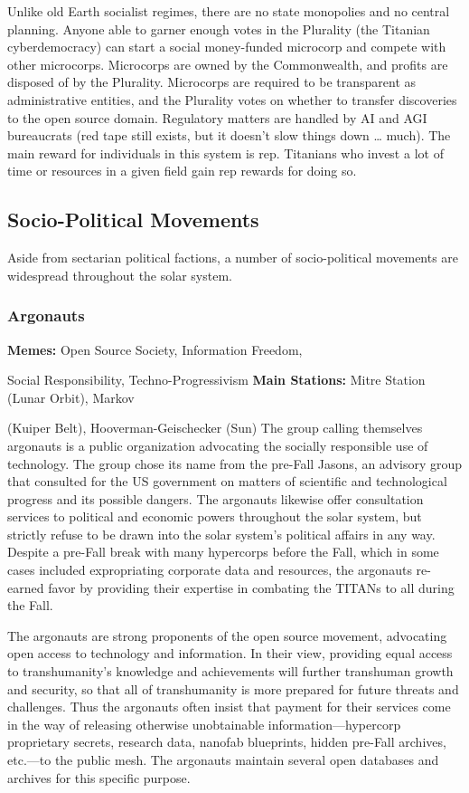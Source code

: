 Unlike old Earth socialist regimes, there are no state 
monopolies and no central planning. Anyone able to 
garner enough votes in the Plurality (the Titanian 
cyberdemocracy) can start a social money-funded 
microcorp and compete with other microcorps. 
Microcorps are owned by the Commonwealth, and 
profits are disposed of by the Plurality. Microcorps 
are required to be transparent as administrative entities, and the Plurality votes on whether to transfer 
discoveries to the open source domain. Regulatory 
matters are handled by AI and AGI bureaucrats (red 
tape still exists, but it doesn't slow things down …
much). The main reward for individuals in this system 
is rep. Titanians who invest a lot of time or resources 
in a given field gain rep rewards for doing so.

\subsection{Socio-Political Movements}

Aside from sectarian political factions, a number of 
socio-political movements are widespread throughout 
the solar system.

\subsubsection{Argonauts}

\textbf{Memes:} Open Source Society, Information Freedom, 

Social Responsibility, Techno-Progressivism
\textbf{Main Stations:} Mitre Station (Lunar Orbit), Markov 

(Kuiper Belt), Hooverman-Geischecker (Sun)
The group calling themselves argonauts is a public 
organization advocating the socially responsible use 
of technology. The group chose its name from the 
pre-Fall Jasons, an advisory group that consulted 
for the US government on matters of scientific and 
technological progress and its possible dangers. The 
argonauts likewise offer consultation services to 
political and economic powers throughout the solar 
system, but strictly refuse to be drawn into the solar 
system's political affairs in any way. Despite a pre-Fall 
break with many hypercorps before the Fall, which in 
some cases included expropriating corporate data and 
resources, the argonauts re-earned favor by providing 
their expertise in combating the TITANs to all during 
the Fall.

The argonauts are strong proponents of the open 
source movement, advocating open access to technology and information. In their view, providing equal 
access to transhumanity's knowledge and achievements will further transhuman growth and security, 
so that all of transhumanity is more prepared for 
future threats and challenges. Thus the argonauts 
often insist that payment for their services come in 
the way of releasing otherwise unobtainable information—hypercorp proprietary secrets, research data, 
nanofab blueprints, hidden pre-Fall archives, etc.—to 
the public mesh. The argonauts maintain several open 
databases and archives for this specific purpose.

